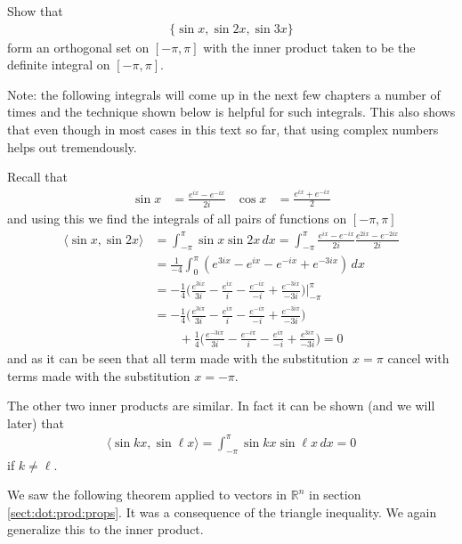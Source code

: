 \begin{example} \label{ex:orthog:set}
Show that 
%
\begin{align*}
\{\sin x, \sin 2x, \sin 3x\}
\end{align*}
form an orthogonal set on $[-\pi,\pi]$ with the inner product taken to be the definite integral on $[-\pi,\pi]$.  

\solution

Note:  the following integrals will come up in the next few chapters a number of times and the technique shown below is helpful for such integrals.  This also shows that even though in most cases in this text so far, that using complex numbers helps out tremendously.  

Recall that 
%
\begin{align*}
\sin x & = \frac{e^{ix} - e^{-ix}}{2i} & \cos x & = \frac{e^{ix} + e^{-ix}}{2} 
\end{align*}
and using this we find the integrals of all pairs of functions on $[-\pi,\pi]$
%
\begin{align*}
\langle \sin x, \sin 2x \rangle & = \int_{-\pi}^{\pi} \sin x \sin 2x \, dx  = \int_{-\pi}^{\pi} \frac{e^{ix} - e^{-ix}}{2i} \frac{e^{2ix} - e^{-2ix}}{2i} \\
& = \frac{1}{-4} \int_0^{\pi} (e^{3ix} -e^{ix} -e^{-ix} + e^{-3ix} ) \, dx \\
& = -\frac{1}{4} \biggl( \frac{e^{3ix}}{3i} - \frac{e^{ix}}{i} - \frac{e^{-ix}}{-i} + \frac{e^{-3ix}}{-3i} \biggr) \biggr\vert_{-\pi}^{\pi} \\
& = -\frac{1}{4} \biggl( \frac{e^{3i\pi}}{3i} - \frac{e^{i\pi}}{i} - \frac{e^{-i\pi}}{-i} + \frac{e^{-3i\pi}}{-3i} \biggr) \\
& \qquad +\frac{1}{4} \biggl( \frac{e^{-3i\pi}}{3i} - \frac{e^{-i\pi}}{i} - \frac{e^{i\pi}}{-i} + \frac{e^{3i\pi}}{-3i} \biggr) = 0 
\end{align*}
and as it can be seen that all term made with the substitution $x=\pi$ cancel with terms made with the substitution $x=-\pi$.  

The other two inner products are similar.  In fact it can be shown (and we will later) that
%
\begin{align*}
\langle \sin kx, \sin \ell x \rangle = \int_{-\pi}^{\pi} \sin kx \sin \ell x \, dx  = 0 
\end{align*}
if $k \neq \ell$.  
\end{example}

We saw the following theorem applied to vectors in $\mathbb{R}^n$ in section \ref{sect:dot:prod:props}. It was a consequence of the triangle inequality.  We again generalize this to the inner product.  


